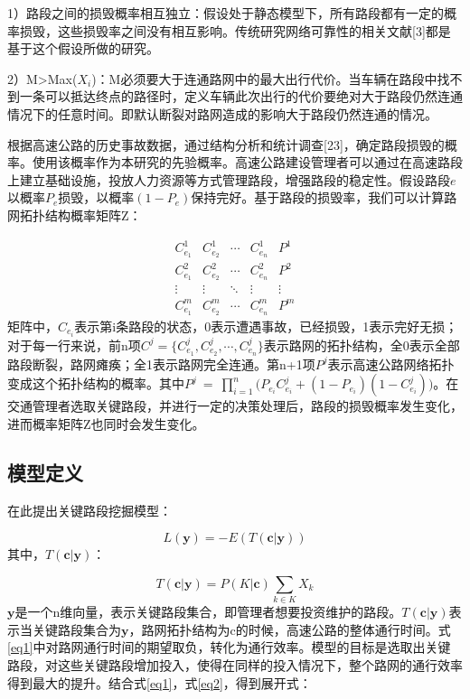 			1）路段之间的损毁概率相互独立：假设处于静态模型下，所有路段都有一定的概率损毁，这些损毁率之间没有相互影响。传统研究网络可靠性的相关文献[3]都是基于这个假设所做的研究。

			2）M>Max($X_i$)：M必须要大于连通路网中的最大出行代价。当车辆在路段中找不到一条可以抵达终点的路径时，定义车辆此次出行的代价要绝对大于路段仍然连通情况下的任意时间。即默认断裂对路网造成的影响大于路段仍然连通的情况。

			根据高速公路的历史事故数据，通过结构分析和统计调查[23]，确定路段损毁的概率。使用该概率作为本研究的先验概率。高速公路建设管理者可以通过在高速路段上建立基础设施，投放人力资源等方式管理路段，增强路段的稳定性。假设路段$e$以概率$P_e$损毁，以概率$(1-P_e)$保持完好。基于路段的损毁率，我们可以计算路网拓扑结构概率矩阵Z：

		\[\begin{array}{*{20}{c}}
		{C_{{e_1}}^1}&{C_{{e_2}}^1}& \cdots &{C_{{e_n}}^1}&{{P^1}}\\
		{C_{{e_1}}^2}&{C_{{e_2}}^2}& \cdots &{C_{{e_n}}^2}&{{P^2}}\\
		 \vdots & \vdots & \ddots & \vdots & \vdots \\
		{C_{{e_1}}^m}&{C_{{e_2}}^m}& \cdots &{C_{{e_n}}^m}&{{P^m}}
		\end{array}\]
		矩阵中，$C_{{e_i}}$表示第i条路段的状态，0表示遭遇事故，已经损毁，1表示完好无损；对于每一行来说，前n项$C^j = \{{C_{{e_1}}^j},{C_{{e_2}}^j},\cdots,{C_{{e_n}}^j}\}$表示路网的拓扑结构，全0表示全部路段断裂，路网瘫痪；全1表示路网完全连通。第n+1项$P^j$表示高速公路网络拓扑变成这个拓扑结构的概率。其中$P^j \ = \ \prod\limits_{i = 1}^n {({P_{{e_i}}}C_{{e_i}}^j + (1 - {P_{{e_i}}})} (1 - C_{{e_i}}^j))$。在交通管理者选取关键路段，并进行一定的决策处理后，路段的损毁概率发生变化，进而概率矩阵Z也同时会发生变化。
			\subsection{模型定义}
			在此提出关键路段挖掘模型：

			\begin{equation}
			L(\bm{y}) = -E(T(\bm{c}|\bm{y} ))
			\label{eq1}
			\end{equation}
			其中，$T(\bm{c}|\bm{y} )$：

			\begin{equation}
			T(\bm{c}|\bm{y} ) = P(K|\bm{c})\sum\limits_{k \in K} {{X_k}} 
			\label{eq2}
			\end{equation}
			$\bm{y} $是一个n维向量，表示关键路段集合，即管理者想要投资维护的路段。$T(\bm{c}|\bm{y} )$表示当关键路段集合为$\bm{y}$，路网拓扑结构为c的时候，高速公路的整体通行时间。式\ref{eq1}中对路网通行时间的期望取负，转化为通行效率。模型的目标是选取出关键路段，对这些关键路段增加投入，使得在同样的投入情况下，整个路网的通行效率得到最大的提升。结合式\ref{eq1}，式\ref{eq2}，得到展开式：

